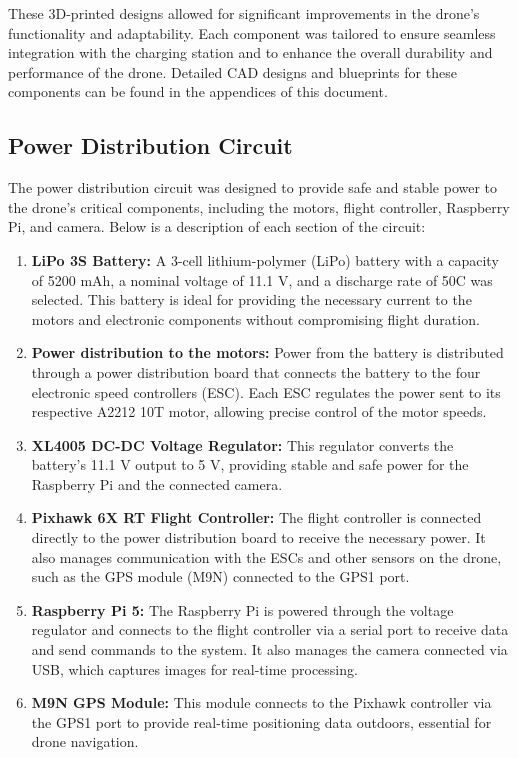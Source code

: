         These 3D-printed designs allowed for significant improvements in the drone’s functionality and adaptability. Each component was tailored to ensure seamless integration with the charging station and to enhance the overall durability and performance of the drone. Detailed CAD designs and blueprints for these components can be found in the appendices of this document.

    
    \subsection{Power Distribution Circuit} 
        The power distribution circuit was designed to provide safe and stable power to the drone's critical components, including the motors, flight controller, Raspberry Pi, and camera. Below is a description of each section of the circuit:
    
        \begin{enumerate}
            \item \textbf{LiPo 3S Battery:} 
            A 3-cell lithium-polymer (LiPo) battery with a capacity of 5200 mAh, a nominal voltage of 11.1 V, and a discharge rate of 50C was selected. This battery is ideal for providing the necessary current to the motors and electronic components without compromising flight duration.
        
            \item \textbf{Power distribution to the motors:} 
            Power from the battery is distributed through a power distribution board that connects the battery to the four electronic speed controllers (ESC). Each ESC regulates the power sent to its respective A2212 10T motor, allowing precise control of the motor speeds.
        
            \item \textbf{XL4005 DC-DC Voltage Regulator:} 
            This regulator converts the battery’s 11.1 V output to 5 V, providing stable and safe power for the Raspberry Pi and the connected camera.
        
            \item \textbf{Pixhawk 6X RT Flight Controller:} 
            The flight controller is connected directly to the power distribution board to receive the necessary power. It also manages communication with the ESCs and other sensors on the drone, such as the GPS module (M9N) connected to the GPS1 port.
        
            \item \textbf{Raspberry Pi 5:} 
            The Raspberry Pi is powered through the voltage regulator and connects to the flight controller via a serial port to receive data and send commands to the system. It also manages the camera connected via USB, which captures images for real-time processing.
        
            \item \textbf{M9N GPS Module:} 
            This module connects to the Pixhawk controller via the GPS1 port to provide real-time positioning data outdoors, essential for drone navigation.
        
        \end{enumerate}
        
